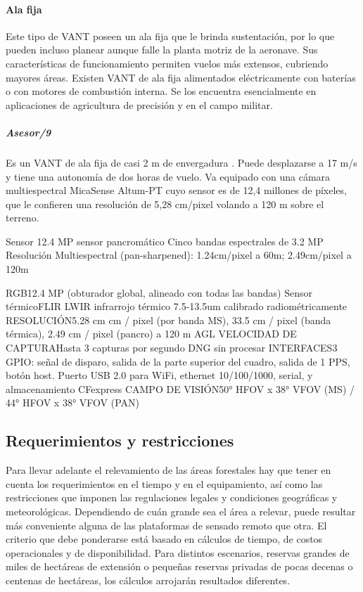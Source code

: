 \paragraph{Ala fija}
Este tipo de VANT poseen un ala fija que le brinda sustentación, por lo que pueden incluso planear aunque falle la planta motriz de la aeronave. Sus características de funcionamiento permiten vuelos más extensos, cubriendo mayores áreas. Existen VANT de ala fija alimentados eléctricamente con baterías o con motores de combustión interna. Se los encuentra esencialmente en aplicaciones de agricultura de precisión y en el campo militar. 
\subparagraph{Asesor/9}
Es un VANT de ala fija de casi 2 m de envergadura \cite{noauthor_drone_nodate}. Puede desplazarse a 17 m/s y tiene una autonomía de dos horas de vuelo. Va equipado con una cámara multiespectral MicaSense Altum-PT \cite{noauthor_altum-pt_2023} cuyo sensor es de 12,4 millones de píxeles, que le confieren una resolución de 5,28 cm/pixel volando a 120 m sobre el terreno.

Sensor
12.4 MP sensor pancromático
Cinco bandas espectrales de 3.2 MP
Resolución
Multiespectral (pan-sharpened): 1.24cm/pixel a 60m; 2.49cm/pixel a 120m

RGB12.4 MP (obturador global, alineado con todas las bandas)
Sensor térmicoFLIR LWIR infrarrojo térmico 7.5-13.5um calibrado radiométricamente
RESOLUCIÓN5.28 cm cm / pixel (por banda MS), 33.5 cm / pixel (banda térmica), 2.49 cm / pixel (pancro) a 120 m AGL
VELOCIDAD DE CAPTURAHasta 3 capturas por segundo DNG sin procesar
INTERFACES3 GPIO: señal de disparo, salida de la parte superior del cuadro, salida de 1 PPS, botón host. Puerto USB 2.0 para WiFi, ethernet 10/100/1000, serial, y almacenamiento CFexpress
CAMPO DE VISIÓN50° HFOV x 38° VFOV (MS) / 44° HFOV x 38° VFOV (PAN)
\subsection{Requerimientos y restricciones}
Para llevar adelante el relevamiento de las áreas forestales hay que tener en cuenta los requerimientos en el tiempo y en el equipamiento, así como las restricciones que imponen las regulaciones legales y condiciones geográficas y meteorológicas. Dependiendo de cuán grande sea el área a relevar, puede resultar más conveniente alguna de las plataformas de sensado remoto que otra. El criterio que debe ponderarse está basado en cálculos de tiempo, de costos operacionales y de disponibilidad. Para distintos escenarios, reservas grandes de miles de hectáreas de extensión o pequeñas reservas privadas de pocas decenas o centenas de hectáreas, los cálculos arrojarán resultados diferentes.
